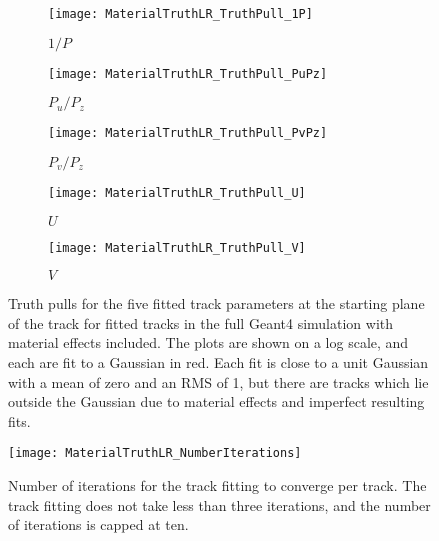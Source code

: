     \begin{figure}[]
    \centering
        \begin{subfigure}[t]{0.45\textwidth}
            \centering
            \texttt{[image: MaterialTruthLR\_TruthPull\_1P]}
            \caption{$1/P$}
        \end{subfigure}%

        \vspace{2mm}
        \begin{subfigure}[t]{0.45\textwidth}
            \centering
            \texttt{[image: MaterialTruthLR\_TruthPull\_PuPz]}
            \caption{$P_{u}/P_{z}$}
        \end{subfigure}
        \begin{subfigure}[t]{0.45\textwidth}
            \centering
            \texttt{[image: MaterialTruthLR\_TruthPull\_PvPz]}
            \caption{$P_{v}/P_{z}$}
        \end{subfigure}%
        \vspace{2mm}
        \begin{subfigure}[t]{0.45\textwidth}
            \centering
            \texttt{[image: MaterialTruthLR\_TruthPull\_U]}
            \caption{$U$}
        \end{subfigure}
        \begin{subfigure}[t]{0.45\textwidth}
            \centering
            \texttt{[image: MaterialTruthLR\_TruthPull\_V]}
            \caption{$V$}
        \end{subfigure}%
    \caption[Track parameter truth pulls for fitted tracks in the \gmtwo Geant4 simulation with material effects included]{Truth pulls for the five fitted track parameters at the starting plane of the track for fitted tracks in the full \gmtwo Geant4 simulation with material effects included. The plots are shown on a log scale, and each are fit to a Gaussian in red. Each fit is close to a unit Gaussian with a mean of zero and an RMS of 1, but there are tracks which lie outside the Gaussian due to material effects and imperfect resulting fits.}
    \label{fig:MaterialTruthPulls}
    \end{figure}

    \begin{figure}[]
      \centering
      \texttt{[image: MaterialTruthLR\_NumberIterations]}
        \caption[Number of iterations for the track fitting to converge]{Number of iterations for the track fitting to converge per track. The track fitting does not take less than three iterations, and the number of iterations is capped at ten.}
        \label{fig:Iterations}
    \end{figure}


